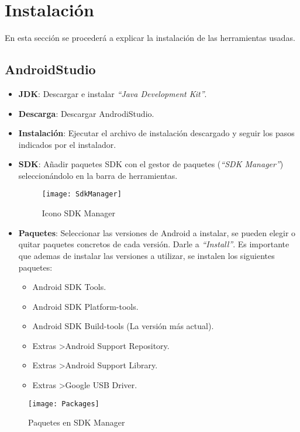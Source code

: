 		
\newpage	
\section{Instalación}
	En esta sección se procederá a explicar la instalación de las herramientas usadas.

	\subsection{AndroidStudio}
		\begin{itemize}
			\item {\bf JDK}: Descargar e instalar {\it ``Java Development Kit''}\cite{17:jdk:online}.
			\item {\bf Descarga}: Descargar AndrodiStudio.
			\item {\bf Instalación}: Ejecutar el archivo de instalación descargado y seguir los pasos indicados por el instalador.
			\item {\bf SDK}: Añadir paquetes SDK con el gestor de paquetes ({\em ``SDK Manager''}) seleccionándolo en la barra de herramientas.
				\begin{figure}[h]
					\centering
					\texttt{[image: SdkManager]}
					\caption{Icono SDK Manager}
					\label{fig:SdkManager}
				\end{figure}
			\item {\bf Paquetes}: Seleccionar las versiones de Android\cite{2:android:online} a instalar, se pueden elegir o quitar paquetes concretos de cada versión. Darle a {\em ``Install''}. Es importante que ademas de instalar las versiones a utilizar, se instalen los siguientes paquetes:
				\begin{itemize}
					\item Android SDK Tools.
					\item Android SDK Platform-tools.
					\item Android SDK Build-tools (La versión más actual).
					\item Extras \textgreater Android Support Repository.
					\item Extras \textgreater Android Support Library.
					\item Extras \textgreater Google USB Driver.
				\end{itemize}
		\end{itemize}
		
		\begin{figure}[h]
			\centering
			\texttt{[image: Packages]}
			\caption{Paquetes en SDK Manager}
			\label{fig:SdkManagerPackages}
		\end{figure}
		
